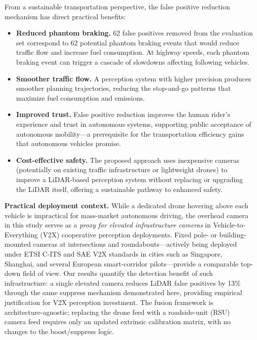 \documentclass[sustainability,article,submit,moreauthors,pdftex]{Definitions/mdpi}
\begin{document}
From a sustainable transportation perspective, the false positive reduction mechanism has direct practical benefits:

\begin{itemize}[leftmargin=*,labelsep=5.8mm]
\item \textbf{Reduced phantom braking.} 62 false positives removed from the evaluation set correspond to 62 potential phantom braking events that would reduce traffic flow and increase fuel consumption. At highway speeds, each phantom braking event can trigger a cascade of slowdowns affecting following vehicles.
\item \textbf{Smoother traffic flow.} A perception system with higher precision produces smoother planning trajectories, reducing the stop-and-go patterns that maximize fuel consumption and emissions.
\item \textbf{Improved trust.} False positive reduction improves the human rider's experience and trust in autonomous systems, supporting public acceptance of autonomous mobility---a prerequisite for the transportation efficiency gains that autonomous vehicles promise.
\item \textbf{Cost-effective safety.} The proposed approach uses inexpensive cameras (potentially on existing traffic infrastructure or lightweight drones) to improve a LiDAR-based perception system without replacing or upgrading the LiDAR itself, offering a sustainable pathway to enhanced safety.
\end{itemize}

\noindent\textbf{Practical deployment context.}
While a dedicated drone hovering above each vehicle is impractical for mass-market autonomous driving, the overhead camera in this study serves as a \emph{proxy for elevated infrastructure cameras} in Vehicle-to-Everything (V2X) cooperative perception deployments.
Fixed pole- or building-mounted cameras at intersections and roundabouts---actively being deployed under ETSI C-ITS and SAE V2X standards in cities such as Singapore, Shanghai, and several European smart-corridor pilots---provide a comparable top-down field of view.
Our results quantify the detection benefit of such infrastructure: a single elevated camera reduces LiDAR false positives by 13\% through the same suppress mechanism demonstrated here, providing empirical justification for V2X perception investment.
The fusion framework is architecture-agnostic; replacing the drone feed with a roadside-unit (RSU) camera feed requires only an updated extrinsic calibration matrix, with no changes to the boost/suppress logic.
\end{document}
